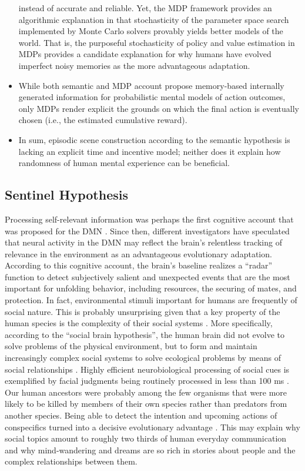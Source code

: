 \documentclass[10pt,letterpaper]{article}
\begin{document}
\begin{itemize}
  instead of accurate and reliable.
  Yet, the MDP framework provides an algorithmic explanation in that
  stochasticity of the parameter space search implemented
  by Monte Carlo solvers provably yields better models of the world.
  That is, the purposeful stochasticity of policy and value estimation
  in MDPs provides a candidate explanation for why humans
  have evolved imperfect noisy memories
  as the more advantageous adaptation.
  \item While both semantic and MDP account propose memory-based internally
  generated information for probabilistic mental models of action outcomes,
  only MDPs render explicit the grounds on which the final action is
  eventually chosen (i.e., the estimated cumulative reward).
  \item In sum, episodic scene construction according to the semantic
  hypothesis is lacking an explicit time and incentive model;
  neither does it explain how randomness of human mental experience
  can be beneficial.
\end{itemize}



\subsection{Sentinel Hypothesis}
Processing self-relevant information was perhaps the first
cognitive account that was proposed for the DMN \citep{gusnard2001medial}.
Since then,
different investigators have speculated that neural activity in the DMN
may reflect the brain’s relentless tracking of
relevance in the environment
as an advantageous evolutionary adaptation.
According to this cognitive account, the brain's baseline realizes
a ``radar'' function to
detect subjectively salient and unexpected events that
are the most important for unfolding behavior,
including resources,
the securing of mates, and protection.
%
In fact,
environmental stimuli important for humans are frequently of
social nature. This is probably unsurprising
given that a key property of the human species is
the complexity of their social systems
\citep{tomasello2009cultural}.
More specifically,
according to the ``social brain hypothesis'',
the human brain did not evolve to solve problems of the
physical environment, but to form and maintain increasingly complex
social systems to solve ecological problems by means of social relationships
\citep{whiten1988machiavellian}.
Highly efficient neurobiological processing of social cues is exemplified by
facial judgments being routinely processed in less than 100 ms
\citep{bar2006very}.
Our human ancestors were probably among the few organisms that
were more likely to be killed by members of their own species
rather than predators from another species.
Being able to detect the intention and upcoming actions of conspecifics
turned into a decisive evolutionary advantage
\citep{frith2010social}.
%
This may explain why social topics amount to roughly
two thirds of human everyday communication \citep{dunbar1997human}
and
why mind-wandering and dreams
are so rich in stories about people and the complex relationships between them.
\end{document}
